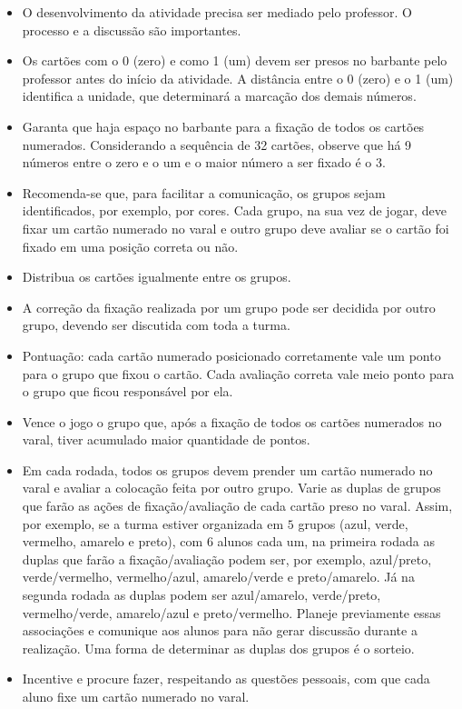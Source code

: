 \begin{atividade}
\discussoes
\begin{itemize}
  \item O desenvolvimento da atividade precisa ser mediado pelo professor. O processo e a discussão são importantes.
  \item Os cartões com o 0 (zero) e como 1 (um) devem ser presos no barbante pelo professor antes do início da atividade. A distância entre o 0 (zero) e o 1 (um) identifica a unidade, que determinará a marcação dos demais números.
  \item Garanta que haja espaço no barbante  para a fixação de todos os cartões numerados. Considerando a sequência de 32 cartões, observe que há 9 números entre o zero e o um e o maior número a ser fixado é o 3.
  \item Recomenda-se que, para facilitar a comunicação, os grupos sejam identificados, por exemplo, por cores. Cada grupo, na sua vez de jogar, deve fixar um cartão numerado no varal e outro grupo deve avaliar se o cartão foi fixado em uma posição correta ou não.
  \item Distribua os cartões igualmente entre os grupos.
  \item A correção da fixação realizada por um grupo pode ser decidida por outro grupo, devendo ser discutida com toda a turma.
  \item Pontuação: cada cartão numerado posicionado corretamente vale um ponto para o grupo que fixou o cartão. Cada avaliação correta vale meio ponto para o grupo que ficou responsável por ela.
  \item Vence o jogo o grupo que, após a fixação de todos os cartões numerados no varal, tiver acumulado maior quantidade de pontos.
  \item Em cada rodada, todos os grupos devem prender um cartão numerado no varal e avaliar a colocação feita por outro grupo. Varie as duplas de grupos que farão as ações de fixação/avaliação de cada cartão preso no varal. Assim, por exemplo, se a turma estiver organizada em $5$ grupos (azul, verde, vermelho, amarelo e preto), com 6 alunos cada um, na primeira rodada as duplas que farão a fixação/avaliação podem ser, por exemplo, azul/preto, verde/vermelho, vermelho/azul, amarelo/verde e preto/amarelo. Já na segunda rodada as duplas podem ser azul/amarelo, verde/preto, vermelho/verde, amarelo/azul e preto/vermelho. Planeje previamente essas associações e comunique aos alunos para não gerar discussão durante a realização. Uma forma de determinar as duplas dos grupos é o sorteio. 
  \item Incentive e procure fazer, respeitando as questões pessoais, com que cada aluno fixe um cartão numerado no varal. 

\end{itemize}
\end{atividade}
